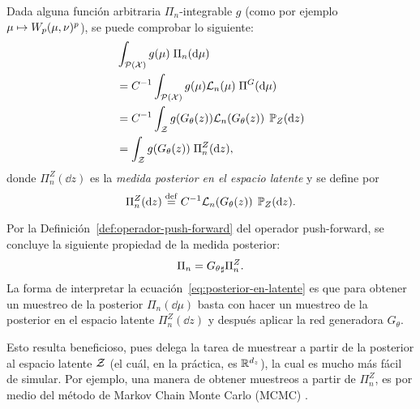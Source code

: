 Dada alguna función arbitraria $\Pi_n$-integrable $g$ (como por ejemplo $\mu \mapsto \Wasserstein[p]{\mu}{\nu}^p$), se puede comprobar lo siguiente:
\begin{align}
     & \int_{\ProbSpace[\cX]} g(\mu) \; \Pi_n(\dd \mu)                         \\
     & = C^{-1} \int_{\ProbSpace[\cX]} g(\mu) \cL_n(\mu) \; \Pi^G(\dd \mu)     \\
     & = C^{-1} \int_{\cZ} g(G_\theta(z)) \cL_n(G_\theta(z)) \; \Prob_Z(\dd z) \\
     & = \int_{\cZ} g(G_\theta(z)) \; \Pi^Z_n(\dd z),
\end{align}
donde $\Pi^Z_n(\dd z)$ es la \textit{medida posterior en el espacio latente} y se define por
\begin{equation}
    \Pi^Z_n(\dd z) \eqdef C^{-1} \cL_n(G_\theta(z)) \; \Prob_Z(\dd z).
\end{equation}

Por la Definición~\ref{def:operador-push-forward} del operador push-forward, se concluye la siguiente propiedad de la medida posterior:
\begin{equation}\label{eq:posterior-en-latente}
    \Pi_n = \pf{G_\theta} \Pi^Z_n.
\end{equation}
La forma de interpretar la ecuación~\eqref{eq:posterior-en-latente} es que para obtener un muestreo de la posterior $\Pi_n(\dd \mu)$ basta con hacer un muestreo de la posterior en el espacio latente $\Pi^Z_n(\dd z)$ y después aplicar la red generadora $G_\theta$.

Esto resulta beneficioso, pues delega la tarea de muestrear a partir de la posterior al espacio latente $\cZ$ (el cuál, en la práctica, es $\R^{d_z}$), la cual es mucho más fácil de simular. Por ejemplo, una manera de obtener muestreos a partir de $\Pi^Z_n$, es por medio del método de Markov Chain Monte Carlo (MCMC) \cite{andrieu2003introduction,brooks2011handbook,goodman2010ensemble}.








